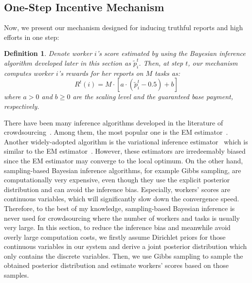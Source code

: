\documentclass{article}
\newtheorem{definition}{Definition}
\begin{document}
\subsection{One-Step Incentive Mechanism}
Now, we present our mechanism designed for inducing truthful reports and high efforts in one step:
\begin{definition}
\label{MechDef}
Denote worker $i$'s score estimated by using the Bayesian inference algorithm developed later in this section as $\tilde{p}^{t}_i$. Then, at step $t$, our mechanism computes worker $i$'s rewards for her reports on $M$ tasks as:
\begin{equation}
R^t(i)=M\cdot [a\cdot (\tilde{p}^{t}_i - 0.5)+b]
\end{equation}
where $a>0$ and $b\geq 0$ are the scaling level and the guaranteed base payment, respectively.
\end{definition}
There have been many inference algorithms developed in the literature of crowdsourcing~\cite{zheng2017truth}. Among them, the most popular one is the EM estimator~\cite{dawid1979maximum}. Another widely-adopted algorithm is the variational inference estimator~\cite{liu2012variational} which is similar to the EM estimator~\cite{tzikas2008variational}.
However, these estimators are irredeemably biased since the EM estimator may converge to the local optimum.
On the other hand, sampling-based Bayesian inference algorithms, for example Gibbs sampling, are computationally very expensive, even though they use the explicit posterior distribution and can avoid the inference bias.
Especially, workers' scores are continuous variables, which will significantly slow down the convergence speed.
Therefore, to the best of my knowledge, sampling-based Bayesian inference is never used for crowdsourcing where the number of workers and tasks is usually very large.
In this section, to reduce the inference bias and meanwhile avoid overly large computation costs, we firstly assume Dirichlet priors for those continuous variables in our system and derive a joint posterior distribution which only contains the discrete variables.
Then, we use Gibbs sampling to sample the obtained posterior distribution and estimate workers' scores based on those samples.
\end{document}
